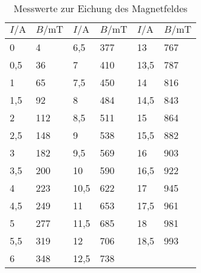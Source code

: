 
\begin{table}[H]
  \centering
  \caption{Messwerte zur Eichung des Magnetfeldes}
  \label{tab:tabe1}
    \begin{tabular}{l l| l l | l l}
    \toprule
    $ I / \si{\ampere} $ & $ B / \si{\milli\tesla} $ & $ I / \si{\ampere} $ & $ B / \si{\milli\tesla} $ & $ I / \si{\ampere} $ & $ B / \si{\milli\tesla} $ \\
    \midrule
    0 & 4 & 6,5 & 377 & 13 & 767 \\
    0,5 & 36 & 7 & 410 & 13,5 & 787 \\
    1 & 65 & 7,5 & 450 & 14 & 816 \\
    1,5 & 92 & 8 & 484 & 14,5 & 843 \\
    2 & 112 & 8,5 & 511 & 15 & 864 \\
    2,5 & 148 & 9 & 538 & 15,5 & 882 \\
    3 & 182 & 9,5 & 569 & 16 & 903 \\
    3,5 & 200 & 10 & 590 & 16,5 & 922 \\
    4 & 223 & 10,5 & 622 & 17 & 945 \\
    4,5 & 249 & 11 & 653 & 17,5 & 961 \\
    5 & 277 & 11,5 & 685 & 18  & 981 \\
    5,5 & 319 & 12 & 706 & 18,5 & 993 \\
    6 & 348 & 12,5 & 738 & & \\



          \bottomrule
        \end{tabular}
    \end{table}
